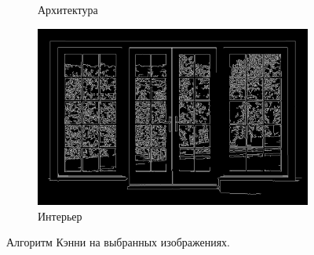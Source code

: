 \documentclass[a4paper, 16pt]{article}
\begin{document}
\begin{figure}[htbp]
\begin{subfigure}{0.3\textwidth}
            \caption{Архитектура}
            \label{fig:canny_i2}
        \end{subfigure}
        \hfill
        \begin{subfigure}{0.3\textwidth}
            \centering
            \includegraphics[width=\linewidth]{canny_i3.png}
            \caption{Интерьер}
            \label{fig:canny_i3}
        \end{subfigure}
        \caption{Алгоритм Кэнни на выбранных изображениях.}
        \label{fig:canny_is}
    \end{figure}
\end{document}
